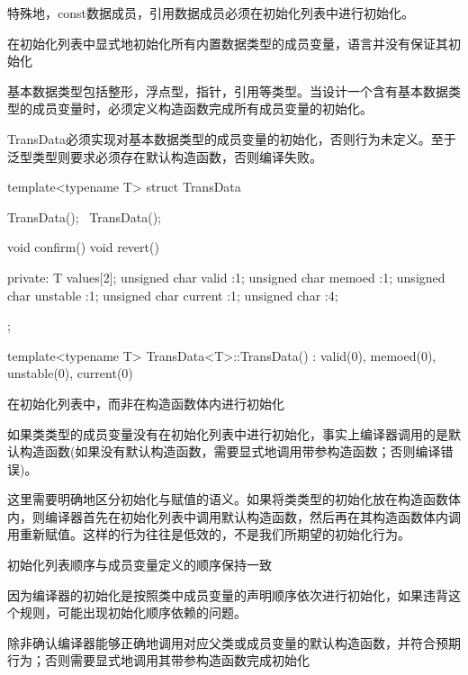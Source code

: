 \begin{content}
特殊地，const数据成员，引用数据成员必须在初始化列表中进行初始化。

\begin{regulation}
在初始化列表中显式地初始化所有内置数据类型的成员变量，\cpp{}语言并没有保证其初始化
\end{regulation}

基本数据类型包括整形，浮点型，指针，引用等类型。当设计一个含有基本数据类型的成员变量时，必须定义构造函数完成所有成员变量的初始化。

TransData必须实现对基本数据类型的成员变量的初始化，否则行为未定义。至于泛型类型则要求必须存在默认构造函数，否则编译失败。

\begin{leftbar}
\begin{c++}
template<typename T>
struct TransData
{
   TransData();
   ~TransData();

   void confirm()
   void revert()

private:
   T values[2];
   unsigned char valid :1;
   unsigned char memoed :1;
   unsigned char unstable :1;
   unsigned char current :1;
   unsigned char :4;
};

template<typename T>
TransData<T>::TransData()
  : valid(0), memoed(0), unstable(0), current(0)
{
}
\end{c++}
\end{leftbar}

\begin{regulation}
在初始化列表中，而非在构造函数体内进行初始化
\end{regulation}

如果类类型的成员变量没有在初始化列表中进行初始化，事实上编译器调用的是默认构造函数(如果没有默认构造函数，需要显式地调用带参构造函数；否则编译错误)。

这里需要明确地区分初始化与赋值的语义。如果将类类型的初始化放在构造函数体内，则编译器首先在初始化列表中调用默认构造函数，然后再在其构造函数体内调用重新赋值。这样的行为往往是低效的，不是我们所期望的初始化行为。

\begin{regulation}
初始化列表顺序与成员变量定义的顺序保持一致
\end{regulation}

因为编译器的初始化是按照类中成员变量的声明顺序依次进行初始化，如果违背这个规则，可能出现初始化顺序依赖的问题。

\begin{regulation}
除非确认编译器能够正确地调用对应父类或成员变量的默认构造函数，并符合预期行为；否则需要显式地调用其带参构造函数完成初始化
\end{regulation}


\end{content}
